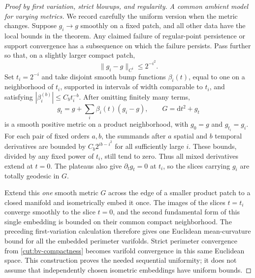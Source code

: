\documentclass[11pt]{article}
\numberwithin{equation}{section}
\theoremstyle{definition}
\theoremstyle{remark}
\begin{document}
\begin{proof}[Proof by first variation, strict blowups, and regularity]
\emph{A common ambient model for varying metrics.}
We record carefully the uniform version when the metric changes.
Suppose $g_i\to g$ smoothly on a fixed patch, and all other data have
the local bounds in the theorem.  Any claimed failure of regular-point
persistence or support convergence has a subsequence on which the
failure persists.  Pass further so that, on a slightly larger compact
patch,
\[
                  \|g_i-g\|_{C^i}\le 2^{-i^2}.
\]
Set $t_i=2^{-i}$ and take disjoint smooth bump functions $\beta_i(t)$,
equal to one on a neighborhood of $t_i$, supported in intervals of
width comparable to $t_i$, and satisfying
$|\beta_i^{(b)}|\le C_b t_i^{-b}$.  After omitting finitely many terms,
\[
 g_t=g+\sum_i\beta_i(t)(g_i-g),\qquad G=\mathrm d t^2+g_t
\]
is a smooth positive metric on a product neighborhood, with $g_0=g$
and $g_{t_i}=g_i$.  For each pair of fixed orders $a,b$, the summands
after $a$ spatial and $b$ temporal derivatives are bounded by
$C_b2^{ib-i^2}$ for all sufficiently large $i$.  These bounds, divided
by any fixed power of $t_i$, still tend to zero.  Thus all mixed
derivatives extend at $t=0$.  The plateaus also give
$\partial_tg_t=0$ at $t_i$, so the slices carrying $g_i$ are totally
geodesic in $G$.

Extend this \emph{one} smooth metric $G$ across the edge of a smaller
product patch to a closed manifold and isometrically embed it once.
The images of the slices $t=t_i$ converge smoothly to the slice
$t=0$, and the second fundamental form of this single embedding is
bounded on their common compact neighborhood.  The preceding
first-variation calculation therefore gives one Euclidean
mean-curvature bound for all the embedded perimeter varifolds.
Strict perimeter convergence from \cref{cut:bv-compactness} becomes
varifold convergence in this same Euclidean space.  This construction
proves the needed sequential uniformity; it does not assume that
independently chosen isometric embeddings have uniform bounds.


\end{proof}
\end{document}
